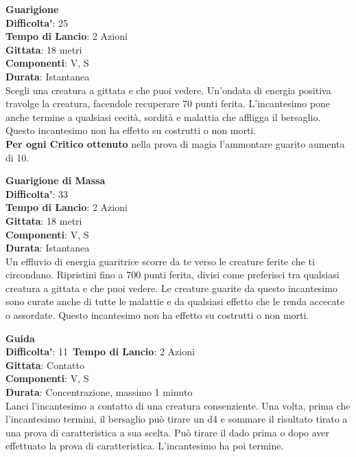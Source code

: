 \begin{multicols}{2}
\medskip\textbf{Guarigione}\\
\textbf{Difficolta'}: 25\\
\textbf{Tempo di Lancio}: 2 Azioni\\
\textbf{Gittata}: 18 metri\\
\textbf{Componenti}: V, S\\
\textbf{Durata}: Istantanea\\
Scegli una creatura a gittata e che puoi vedere. Un’ondata di energia positiva travolge la creatura, facendole recuperare 70 punti ferita. L’incantesimo pone anche termine a qualsiasi cecità, sordità e malattia che affligga il bersaglio. Questo incantesimo non ha effetto su costrutti o non morti.\\
\textbf{Per ogni Critico ottenuto} nella prova di magia l’ammontare guarito aumenta di 10.

\medskip\textbf{Guarigione di Massa}\\
\textbf{Difficolta'}: 33\\
\textbf{Tempo di Lancio}: 2 Azioni\\
\textbf{Gittata}: 18 metri\\
\textbf{Componenti}: V, S\\
\textbf{Durata}: Istantanea\\
Un effluvio di energia guaritrice scorre da te verso le creature ferite che ti circondano. Ripristini fino a 700 punti ferita, divisi come preferisci tra qualsiasi creatura a gittata e che puoi vedere. Le creature guarite da questo incantesimo sono curate anche di tutte le malattie e da qualsiasi effetto che le renda accecate o assordate. Questo incantesimo non ha effetto su costrutti o non morti. 

\medskip\textbf{Guida}\\
\textbf{Difficolta'}: 11\
\textbf{Tempo di Lancio}: 2 Azioni\\
\textbf{Gittata}: Contatto\\
\textbf{Componenti}: V, S\\
\textbf{Durata}: Concentrazione, massimo 1 minuto\\
Lanci l’incantesimo a contatto di una creatura consenziente. Una volta, prima che l’incantesimo termini, il bersaglio può tirare un d4 e sommare il risultato tirato a una prova di caratteristica a sua scelta. Può tirare il dado prima o dopo aver effettuato la prova di caratteristica. L’incantesimo ha poi termine. 


\end{multicols}
